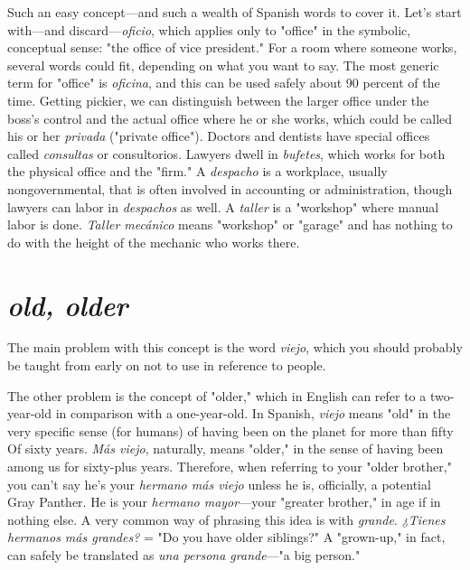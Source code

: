 Such an easy concept---and such a wealth of Spanish words to
cover it. Let's start with---and discard---\emph{oficio}, which applies only to
"office" in the symbolic, conceptual sense: "the office of vice president." For a room where someone works, several words could fit, depending on what you want to say. The most generic term for "office" is
\emph{oficina}, and this can be used safely about 90 percent of the time. Getting pickier, we can distinguish between the larger office under the
boss's control and the actual office where he or she works, which could
be called his or her \emph{privada} ("private office"). Doctors and dentists
have special offices called \emph{consultas} or consultorios. Lawyers dwell in
\emph{bufetes}, which works for both the physical office and the "firm." A
\emph{despacho} is a workplace, usually nongovernmental, that is often involved in accounting or administration, though lawyers can labor in
\emph{despachos} as well. A \emph{taller} is a "workshop" where manual labor is
done. \emph{Taller mecánico} means "workshop" or "garage" and has nothing
to do with the height of the mechanic who works there.

\section{\emph{old, older}}

The main problem with this concept is the word \emph{viejo}, which
you should probably be taught from early on not to use in reference
to people.

The other problem is the concept of "older," which in English
can refer to a two-year-old in comparison with a one-year-old. In Spanish, \emph{viejo} means "old" in the very specific sense (for humans) of having
been on the planet for more than fifty Of sixty years. \emph{Más viejo}, naturally, means "older," in the sense of having been among us for sixty-plus years. Therefore, when referring to your "older brother," you can't
say he's your \emph{hermano más viejo} unless he is, officially, a potential
Gray Panther. He is your \emph{hermano mayor}---your "greater brother," in
age if in nothing else. A very common way of phrasing this idea is with
\emph{grande}. \emph{¿Tienes hermanos más grandes?} = "Do you have older siblings?" A "grown-up," in fact, can safely be translated as \emph{una persona
grande}---"a big person."

